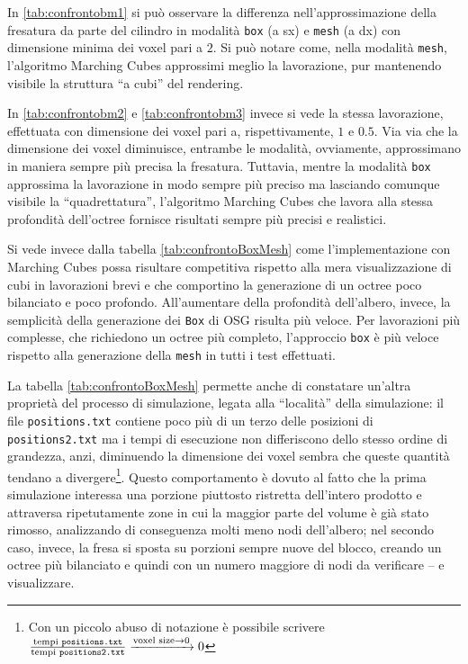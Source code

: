 In \ref{tab:confrontobm1} si può osservare la differenza nell'approssimazione della fresatura da parte del cilindro in modalità \texttt{box} (a sx) e \texttt{mesh} (a dx) con dimensione minima dei voxel pari a $2$. Si può notare come, nella modalità \texttt{mesh}, l'algoritmo Marching Cubes approssimi meglio la lavorazione, pur mantenendo visibile la struttura ``a cubi'' del rendering.

In \ref{tab:confrontobm2} e \ref{tab:confrontobm3} invece si vede la stessa lavorazione, effettuata con dimensione dei voxel pari a, rispettivamente, $1$ e $0.5$. Via via che la dimensione dei voxel diminuisce, entrambe le modalità, ovviamente, approssimano in maniera sempre più precisa la fresatura. Tuttavia, mentre la modalità \texttt{box} approssima la lavorazione in modo sempre più preciso ma lasciando comunque visibile la ``quadrettatura'', l'algoritmo Marching Cubes che lavora alla stessa profondità dell'octree fornisce risultati sempre più precisi e realistici.

Si vede invece dalla tabella \ref{tab:confrontoBoxMesh} come l'implementazione con Marching Cubes possa risultare competitiva rispetto alla mera visualizzazione di cubi in lavorazioni brevi e che comportino la generazione di un octree poco bilanciato e poco profondo. All'aumentare della profondità dell'albero, invece, la semplicità della generazione dei \texttt{Box} di OSG risulta più veloce. Per lavorazioni più complesse, che richiedono un octree più completo, l'approccio \texttt{box} è più veloce rispetto alla generazione della \texttt{mesh} in tutti i test effettuati.

La tabella \ref{tab:confrontoBoxMesh} permette anche di constatare un'altra proprietà del processo di simulazione, legata alla ``località'' della simulazione: il file \texttt{positions.txt} contiene poco più di un terzo delle posizioni di \texttt{positions2.txt} ma i tempi di esecuzione non differiscono dello stesso ordine di grandezza, anzi, diminuendo la dimensione dei voxel sembra che queste quantità tendano a divergere\footnote{Con un piccolo abuso di notazione è possibile scrivere $\frac{\text{tempi \texttt{positions.txt}}}{\text{tempi \texttt{positions2.txt}}} \xrightarrow{\text{voxel size} \rightarrow 0} 0$}. Questo comportamento è dovuto al fatto che la prima simulazione interessa una porzione piuttosto ristretta dell'intero prodotto e attraversa ripetutamente zone in cui la maggior parte del volume è già stato rimosso, analizzando di conseguenza molti meno nodi dell'albero; nel secondo caso, invece, la fresa si sposta su porzioni sempre nuove del blocco, creando un octree più bilanciato e quindi con un numero maggiore di nodi da verificare -- e visualizzare.

